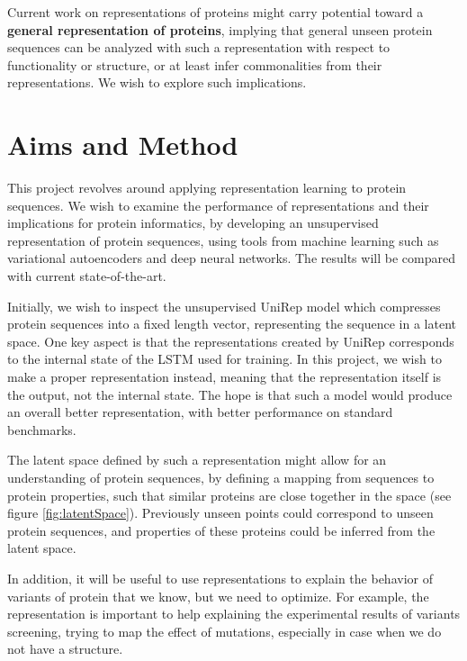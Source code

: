 \documentclass[a4paper,11pt]{article}
\begin{document}
Current work on representations of proteins might carry potential toward a \textbf{general representation of proteins}, implying that general unseen protein sequences can be analyzed with such a representation with respect to functionality or structure, or at least infer commonalities from their representations. We wish to explore such implications.

\section*{Aims and Method}
This project revolves around applying representation learning to protein sequences. We wish to examine the performance of representations and their implications for protein informatics, by developing an unsupervised representation of protein sequences, using tools from machine learning such as variational autoencoders and deep neural networks. The results will be compared with current state-of-the-art.

Initially, we wish to inspect the unsupervised UniRep model \cite{alley2019unified} which compresses protein sequences into a fixed length vector, representing the sequence in a latent space. One key aspect is that the representations created by UniRep corresponds to the internal state of the LSTM used for training. In this project, we wish to make a proper representation instead, meaning that the representation itself is the output, not the internal state. The hope is that such a model would produce an overall better representation, with better performance on standard benchmarks.

The latent space defined by such a representation might allow for an understanding of protein sequences, by defining a mapping from sequences to protein properties, such that similar proteins are close together in the space (see figure \ref{fig:latentSpace}). Previously unseen points could correspond to unseen protein sequences, and properties of these proteins could be inferred from the latent space.

In addition, it will be useful to use representations to explain the behavior of variants of protein that we know, but we need to optimize. For example, the representation is important to help explaining the experimental results of variants screening, trying to map the effect of mutations, especially in case when we do not have a structure.
\end{document}
